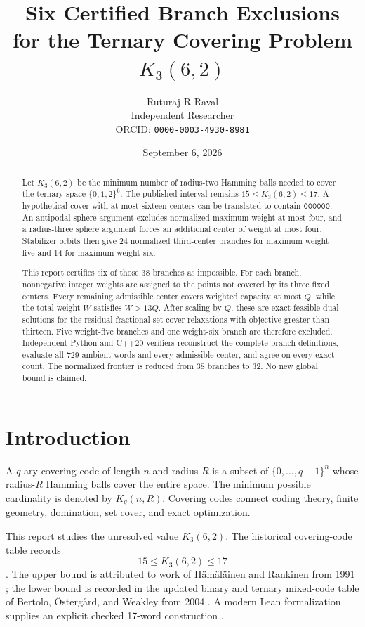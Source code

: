 \documentclass[11pt]{article}
\title{Six Certified Branch Exclusions\\
for the Ternary Covering Problem \(K_3(6,2)\)}
\author{%
  Ruturaj R Raval\\
  \small Independent Researcher\\
  \small ORCID:
  \href{https://orcid.org/0000-0003-4930-8981}
       {\texttt{0000-0003-4930-8981}}
}
\date{September 6, 2026}
\newcommand{\codeword}[1]{\texttt{#1}}
\begin{document}
\maketitle

\begin{abstract}
Let \(K_3(6,2)\) be the minimum number of radius-two Hamming balls needed
to cover the ternary space \(\{0,1,2\}^6\).  The published interval remains
\(15\leq K_3(6,2)\leq 17\).  A hypothetical cover with at most sixteen
centers can be translated to contain \(\codeword{000000}\).  An antipodal
sphere argument excludes normalized maximum weight at most four, and a
radius-three sphere argument forces an additional center of weight at most
four.  Stabilizer orbits then give 24 normalized third-center branches for
maximum weight five and 14 for maximum weight six.

This report certifies six of those 38 branches as impossible.  For each
branch, nonnegative integer weights are assigned to the points not covered
by its three fixed centers.  Every remaining admissible center covers
weighted capacity at most \(Q\), while the total weight \(W\) satisfies
\(W>13Q\).  After scaling by \(Q\), these are exact feasible dual solutions
for the residual fractional set-cover relaxations with objective greater
than thirteen.  Five weight-five branches and one weight-six branch are
therefore excluded.  Independent Python and C++20 verifiers reconstruct
the complete branch definitions, evaluate all 729 ambient words and every
admissible center, and agree on every exact count.  The normalized frontier
is reduced from 38 branches to 32.  No new global bound is claimed.
\end{abstract}

\section{Introduction}

A \(q\)-ary covering code of length \(n\) and radius \(R\) is a subset of
\(\{0,\ldots,q-1\}^n\) whose radius-\(R\) Hamming balls cover the entire
space.  The minimum possible cardinality is denoted by \(K_q(n,R)\).
Covering codes connect coding theory, finite geometry, domination,
set cover, and exact optimization.

This report studies the unresolved value \(K_3(6,2)\).  The historical
covering-code table records
\[
  15\leq K_3(6,2)\leq 17
\]
\cite{keri-table}.  The upper bound is attributed to work of
H\"am\"al\"ainen and Rankinen from 1991
\cite{hamalainen-rankinen-1991}; the lower bound is recorded in the updated
binary and ternary mixed-code table of Bertolo, \"Osterg{\aa}rd, and Weakley
from 2004 \cite{bertolo-ostergard-weakley-2004}.  A modern Lean
formalization supplies an explicit checked 17-word construction
\cite{covering-codes-lean-upper}.
\end{document}
